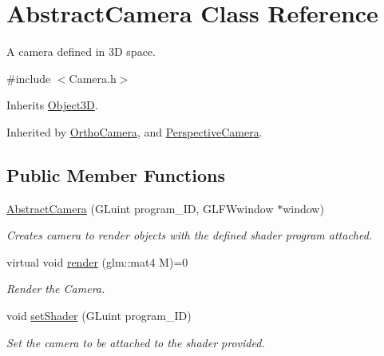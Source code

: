 \hypertarget{class_abstract_camera}{\section{Abstract\-Camera Class Reference}
\label{class_abstract_camera}
}


A camera defined in 3\-D space.  




{\ttfamily \#include $<$Camera.\-h$>$}



Inherits \hyperlink{class_object3_d}{Object3\-D}.



Inherited by \hyperlink{class_ortho_camera}{Ortho\-Camera}, and \hyperlink{class_perspective_camera}{Perspective\-Camera}.

\subsection*{Public Member Functions}
\begin{DoxyCompactItemize}
\item 
\hyperlink{class_abstract_camera_a1cbd2aed19d9859741b95c92217c8023}{Abstract\-Camera} (G\-Luint program\-\_\-\-I\-D, G\-L\-F\-Wwindow $\ast$window)
\begin{DoxyCompactList}\small\item\em Creates camera to render objects with the defined shader program attached. \end{DoxyCompactList}\item 
virtual void \hyperlink{class_abstract_camera_aaf5b7d99f25d511e75a37c5475912956}{render} (glm\-::mat4 M)=0
\begin{DoxyCompactList}\small\item\em Render the Camera. \end{DoxyCompactList}\item 
void \hyperlink{class_abstract_camera_aa25b1e642789c850e6fe63ef468839a2}{set\-Shader} (G\-Luint program\-\_\-\-I\-D)
\begin{DoxyCompactList}\small\item\em Set the camera to be attached to the shader provided. \end{DoxyCompactList}\end{DoxyCompactItemize}

